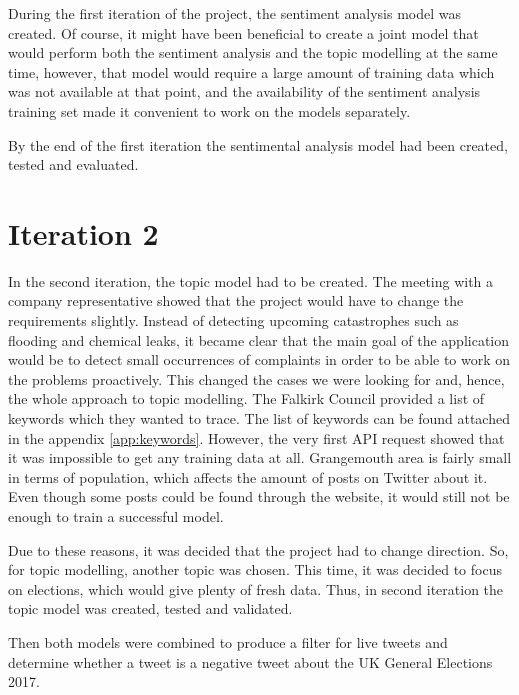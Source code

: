 During the first iteration of the project, the sentiment analysis model was created. Of course, it might have been beneficial to create a joint model that would perform both the sentiment analysis and the topic modelling at the same time, however, that model would require a large amount of training data which was not available at that point, and the availability of the sentiment analysis training set made it convenient to work on the models separately.

By the end of the first iteration the sentimental analysis model had been created, tested and evaluated.


\section{Iteration 2}
\label{sec:it2}

In the second iteration, the topic model had to be created. 
The meeting with a company representative showed that the project would have to change the requirements slightly. Instead of detecting upcoming catastrophes such as flooding and chemical leaks, it became clear that the main goal of the application would be to detect small occurrences of complaints in order to be able to work on the problems proactively. This changed the cases we were looking for and, hence, the whole approach to topic modelling. 
The Falkirk Council provided a list of keywords which they wanted to trace. The list of keywords can be found attached in the appendix \ref{app:keywords}.
However, the very first API request showed that it was impossible to get any training data at all. Grangemouth area is fairly small in terms of population, which affects the amount of posts on Twitter about it. Even though some posts could be found through the website, it would still not be enough to train a successful model. 

Due to these reasons, it was decided that the project had to change direction. So, for topic modelling, another topic was chosen. This time, it was decided to focus on elections, which would give plenty of fresh data. Thus, in second iteration the topic model was created, tested and validated.

Then both models were combined to produce a filter for live tweets and determine whether a tweet is a negative tweet about the UK General Elections 2017. 